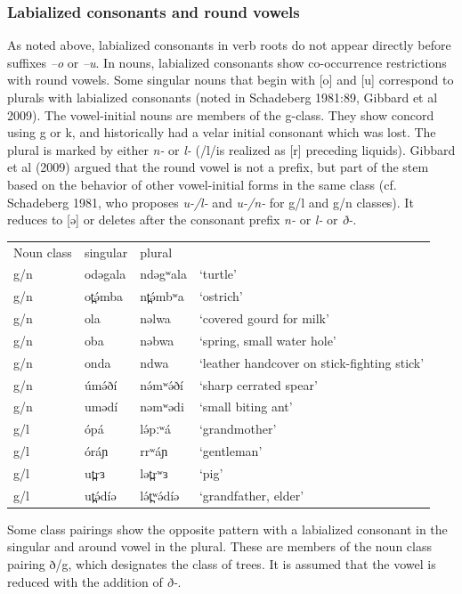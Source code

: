 \subsubsection{Labialized consonants and round vowels}
As noted above, labialized consonants in verb roots do not appear directly before suffixes \textit{–o} or \textit{–u}. In nouns, labialized consonants show co-occurrence restrictions with round vowels. Some singular nouns that begin with [o] and [u] correspond to plurals with labialized consonants (noted in Schadeberg 1981:89, Gibbard et al 2009). The vowel-initial nouns are members of the g-class. They show concord using g or k, and historically had a velar initial consonant which was lost. The plural is marked by either \textit{n-} or \textit{l-} (/l/is realized as [r] preceding liquids). Gibbard et al (2009) argued that the round vowel is not a prefix, but part of the stem based on the behavior of other vowel-initial forms in the same class (cf. Schadeberg 1981, who proposes \textit{u-/l-} and \textit{u-/n-} for g/l and g/n classes). It reduces to [ə] or deletes after the consonant prefix \textit{n-} or \textit{l-} or \textit{ð-}. 

\ea
\begin{tabular}[t]{llll}
	Noun class	&	singular		&	plural\\
	g/n	&	odəgala	&	ndəgʷala&		‘turtle’\\
	g/n	&	ot̪ə́mba	&	nt̪ə́mbʷa	&	‘ostrich’\\
	g/n	&	ola		&	nəlwa	&	‘covered gourd for milk’\\
	g/n	&	oba		&	nəbwa	&	‘spring, small water hole’\\
	g/n	&	onda	&	ndwa		&	‘leather handcover on stick-fighting stick’  \\
	g/n	&	úmə́ðí	&	nə́mʷə́ðí	&	‘sharp cerrated spear’\\
	g/n	&	umədí	&	nəmʷədi	&	‘small biting ant’\\
	g/l	&	ópá		&	lə́pːʷá	&	‘grandmother’\\
	g/l	&	óráɲ	&	rrʷáɲ	&	‘gentleman’\\
	g/l	&	ut̪rɜ 	&	lət̪rʷɜ	&	‘pig’\\
	g/l	&	ut̪ə́díə	&	lə́t̪ʷə́díə	&	‘grandfather, elder’\\
\end{tabular}
\z

Some class pairings show the opposite pattern with a labialized consonant in the singular and around vowel in the plural. These are members of the noun class pairing ð/g, which designates the class of trees. It is assumed that the vowel is reduced with the addition of \textit{ð-}. 

